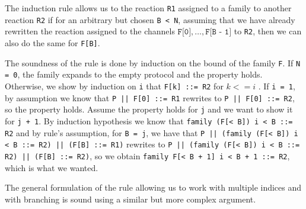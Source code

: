 \documentclass{article}
\begin{document}
\begin{itemize}
The induction rule allows us to the reaction \texttt{R1} assigned
to a family to another reaction \texttt{R2} if for an arbitrary but chosen
\texttt{B < N}, assuming that we have already rewritten the reaction 
assigned to the channels
$\texttt{F[0]}, \ldots, \texttt{F[B - 1]}$ to 
\texttt{R2}, then we can also do the same for \texttt{F[B]}.

The soundness of the rule is done by induction on the bound of the family 
\texttt{F}. If \texttt{N = 0}, the family expands to the empty protocol and
the property holds.
Otherwise, we show by induction on \texttt{i}  that
\texttt{F[k] ::= R2} for $k <= i$ .
If \texttt{i = 1}, by assumption we know that
\texttt{P || F[0] ::= R1} rewrites to \texttt{P || F[0] ::= R2}, so the property
holds. Assume the property holds for \texttt{j} and we want 
to show it for \texttt{j + 1}. 
By induction hypothesis we know that 
\texttt{family (F[< B]) i < B ::= R2}
and 
by rule's assumption, for 
\texttt{B = j}, we have that
\texttt{P || (family (F[< B]) i < B ::= R2) || (F[B] ::= R1)}
rewrites to
\texttt{P || (family (F[< B]) i < B ::= R2) || (F[B] ::= R2)},
so we obtain 
\texttt{family F[< B + 1] i < B + 1 ::= R2}, which is what we wanted. 

The general formulation of the rule allowing us to work with multiple indices
and with branching is sound using a similar but more complex argument.

\end{itemize}


\end{document}
